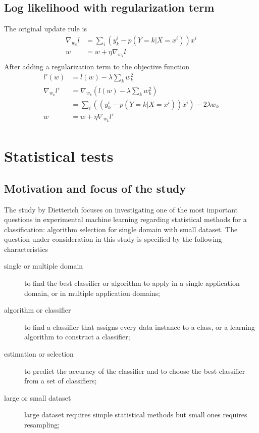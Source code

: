 \documentclass[12pt]{article}
\begin{document}
\subsection{Log likelihood with regularization term}
The original update rule is
\begin{align*}
  \nabla_{w_k} l  &= \sum_i (y_k^i - p(Y=k|X=x^i))x^i \\
  w &= w + \eta \nabla_{w_k} l \\
\end{align*}
After adding a regularization term to the objective function
\begin{align*}
  l'(w)
  &= l(w) - \lambda \sum_k w_k^2 \\
  \nabla_{w_k} l'
  &= \nabla_{w_k} (l(w) - \lambda \sum_k w_k^2) \\
  &= \sum_i ((y_k^i - p(Y=k|X=x^i))x^i) - 2 \lambda w_k \\
  w
  &= w + \eta \nabla_{w_k} l' \\
\end{align*}

\section{Statistical tests}
\subsection{Motivation and focus of the study}
The study by Dietterich \cite{dietterich1998approximate} focuses on investigating one of the most important questions in experimental machine learning regarding statistical methods for a classification: algorithm selection for single domain with small dataset. The question under consideration in this study is specified by the following characteristics
\begin{description}
  \item[single or multiple domain] to find the best classifier or algorithm to apply in a single application domain, or in multiple application domains;
  \item[algorithm or classifier] to find a classifier that assigns every data instance to a class, or a learning algorithm to construct a classifier;
  \item[estimation or selection] to predict the accuracy of the classifier and to choose the best classifier from a set of classifiers;
  \item[large or small dataset] large dataset requires simple statistical methods but small ones requires resampling;
\end{description}
\end{document}

